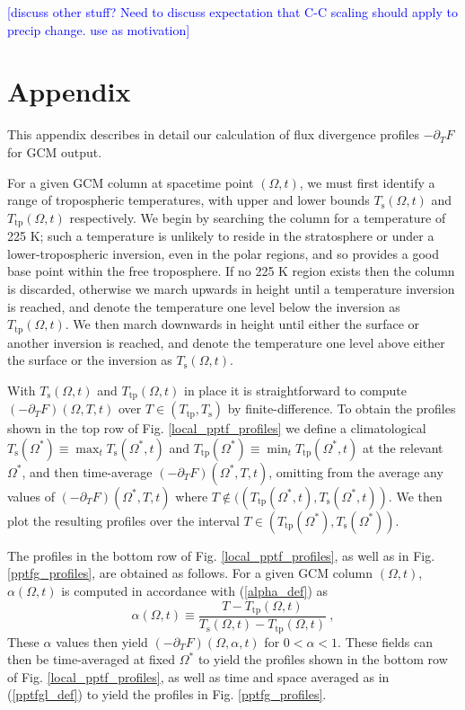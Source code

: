 \documentclass[10pt]{article}
\newcommand{\comment}[1]{\textcolor{blue}{[{#1}]}}
\newcommand{\beqn}{\begin{equation}}
\newcommand{\eeqn}{\end{equation}}
\newcommand{\eqnref}[1]{(\ref{#1})}
\newcommand{\n}{\nonumber}
\newcommand{\ppt}{\ensuremath{\partial_T}}
\newcommand{\Ts}{\ensuremath{T_\mathrm{s}}}
\newcommand{\Ttp}{\ensuremath{T_\mathrm{tp}}}
\begin{document}
\comment{discuss other stuff? Need to discuss expectation that C-C scaling should apply to precip change. use as motivation}		

\section{Appendix}
This appendix describes in detail our calculation of flux divergence profiles $-\ppt F$ for GCM output.

For a given GCM column at spacetime point $(\Omega,t)$, we must first identify a range of tropospheric temperatures, with upper and lower bounds $\Ts(\Omega,t)$ and $\Ttp(\Omega,t)$ respectively.  We begin by searching the column for a temperature of 225 K; such a temperature is unlikely to reside in the stratosphere or under a lower-tropospheric inversion, even in the polar regions, and so  provides a good base point within the free troposphere. If no 225 K region exists then the column is discarded, otherwise we march upwards in height until a temperature inversion is reached, and denote the temperature one level below the inversion as $\Ttp(\Omega,t)$. We then march downwards in height until either the surface or another inversion is reached, and denote the temperature one level above either the surface or the inversion as $\Ts(\Omega,t)$.

With $\Ts(\Omega,t)$ and $\Ttp(\Omega,t)$ in place it is straightforward to compute $(-\ppt F)(\Omega,T,t)$ over $T\in(\Ttp,\Ts)$ by finite-difference. To obtain the profiles shown in the top row of Fig. \ref{local_pptf_profiles} we define a climatological $\Ts(\Omega^*)\equiv \max_t \Ts(\Omega^*,t)$ and $\Ttp(\Omega^*)\equiv \min_t \Ttp(\Omega^*,t)$ at the relevant $\Omega^*$, and  then time-average  $(-\ppt F)(\Omega^*,T,t)$, omitting from the average any values of $(-\ppt F)(\Omega^*,T,t)$ where $T \notin ((\Ttp(\Omega^*,t),\Ts(\Omega^*,t))$. We then plot the resulting profiles over the interval $T\in(\Ttp(\Omega^*),\Ts(\Omega^*))$. 


The profiles in the bottom row of Fig. \ref{local_pptf_profiles}, as well as in Fig. \ref{pptfg_profiles}, are obtained as follows. For a given GCM column $(\Omega,t)$, $\alpha(\Omega,t)$ is computed in accordance with \eqnref{alpha_def} as 
\beqn
	\alpha(\Omega,t) \equiv \frac{T-\Ttp(\Omega,t)}{\Ts(\Omega,t) - \Ttp(\Omega,t)}\ ,
	\label{alpha_def2}
	\n
\eeqn
These $\alpha$ values then yield $(-\ppt F)(\Omega,\alpha,t)$	for $0 < \alpha < 1$. These fields can then be time-averaged at fixed $\Omega^*$ to yield the profiles shown in the bottom row of Fig. \ref{local_pptf_profiles}, as well as time and space averaged  as in \eqnref{pptfgl_def} to yield the profiles in Fig. \ref{pptfg_profiles}. 
\end{document}

